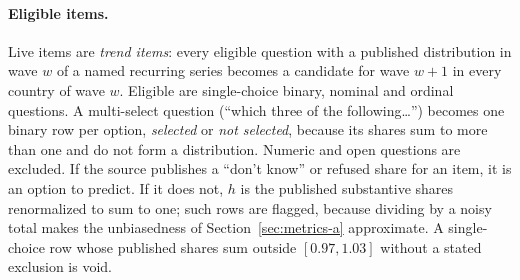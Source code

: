 \documentclass[11pt]{article}
\begin{document}
\paragraph{Eligible items.} Live items are \emph{trend items}: every eligible question with a published distribution in wave $w$ of a named recurring series becomes a candidate for wave $w{+}1$ in every country of wave $w$. Eligible are single-choice binary, nominal and ordinal questions. A multi-select question (``which three of the following\ldots'') becomes one binary row per option, \emph{selected} or \emph{not selected}, because its shares sum to more than one and do not form a distribution. Numeric and open questions are excluded. If the source publishes a ``don't know'' or refused share for an item, it is an option to predict. If it does not, $h$ is the published substantive shares renormalized to sum to one; such rows are flagged, because dividing by a noisy total makes the unbiasedness of Section~\ref{sec:metrics-a} approximate. A single-choice row whose published shares sum outside $[0.97, 1.03]$ without a stated exclusion is void.
\end{document}
